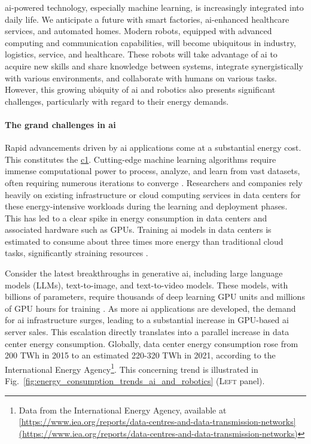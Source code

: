 \documentclass[12pt]{article}
\begin{document}
\Ac{ai}-powered technology, especially machine learning, is increasingly integrated into daily life. We anticipate a future with smart factories, \ac{ai}-enhanced healthcare services, and automated homes. Modern robots, equipped with advanced computing and communication capabilities, will become ubiquitous in industry, logistics, service, and healthcare. These robots will take advantage of \ac{ai} to acquire new skills and share knowledge between systems, integrate synergistically with various environments, and collaborate with humans on various tasks. However, this growing ubiquity of \ac{ai} and robotics also presents significant challenges, particularly with regard to their energy demands.

\paragraph*{The grand challenges in \ac{ai}}
Rapid advancements driven by \ac{ai} applications come at a substantial energy cost. This constitutes the \underline{\ac{c1}}. Cutting-edge machine learning algorithms require immense computational power to process, analyze, and learn from vast datasets, often requiring numerous iterations to converge \cite{Strubell2019EnergyPolicyConsiderations}. Researchers and companies rely heavily on existing infrastructure or cloud computing services in data centers for these energy-intensive workloads during the learning and deployment phases. This has led to a clear spike in energy consumption in data centers and associated hardware such as GPUs. Training \ac{ai} models in data centers is estimated to consume about three times more energy than traditional cloud tasks, significantly straining resources \cite{Thomas2023cloudusesmassive}.

Consider the latest breakthroughs in generative \ac{ai}, including large language models (LLMs), text-to-image, and text-to-video models. These models, with billions of parameters, require thousands of deep learning GPU units and millions of GPU hours for training \cite{Vanian2023ChatGPTgenerativeAI, Corbyn2023Nvidiachipmaker}. As more \ac{ai} applications are developed, the demand for \ac{ai} infrastructure surges, leading to a substantial increase in GPU-based \ac{ai} server sales. This escalation directly translates into a parallel increase in data center energy consumption. Globally, data center energy consumption rose from 200 TWh in 2015 to an estimated 220-320 TWh in 2021, according to the International Energy Agency\footnote{Data from the International Energy Agency, available at \url{[https://www.iea.org/reports/data-centres-and-data-transmission-networks](https://www.iea.org/reports/data-centres-and-data-transmission-networks)}}. This concerning trend is illustrated in Fig.~\ref{fig:energy_consumption_trends_ai_and_robotics} (\textsc{Left} panel).
\end{document}
